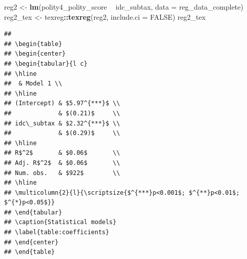 \documentclass[
]{article}
\newenvironment{Shaded}{\begin{snugshade}}{\end{snugshade}}
\newcommand{\DataTypeTok}[1]{\textcolor[rgb]{0.13,0.29,0.53}{#1}}
\newcommand{\KeywordTok}[1]{\textcolor[rgb]{0.13,0.29,0.53}{\textbf{#1}}}
\newcommand{\NormalTok}[1]{#1}
\newcommand{\OperatorTok}[1]{\textcolor[rgb]{0.81,0.36,0.00}{\textbf{#1}}}
\newcommand{\OtherTok}[1]{\textcolor[rgb]{0.56,0.35,0.01}{#1}}
\newcommand{\StringTok}[1]{\textcolor[rgb]{0.31,0.60,0.02}{#1}}
\begin{document}
\begin{Shaded}
\begin{Highlighting}[]
\NormalTok{reg2 <-}\StringTok{ }\KeywordTok{lm}\NormalTok{(polity4_polity_score }\OperatorTok{~}\StringTok{ }\NormalTok{idc_subtax, }\DataTypeTok{data =}\NormalTok{ reg_data_complete)}
\NormalTok{reg2_tex <-}\StringTok{ }\NormalTok{texreg}\OperatorTok{::}\KeywordTok{texreg}\NormalTok{(reg2, }\DataTypeTok{include.ci =} \OtherTok{FALSE}\NormalTok{)}
\NormalTok{reg2_tex}
\end{Highlighting}
\end{Shaded}

\begin{verbatim}
## 
## \begin{table}
## \begin{center}
## \begin{tabular}{l c}
## \hline
##  & Model 1 \\
## \hline
## (Intercept) & $5.97^{***}$ \\
##             & $(0.21)$     \\
## idc\_subtax & $2.32^{***}$ \\
##             & $(0.29)$     \\
## \hline
## R$^2$       & $0.06$       \\
## Adj. R$^2$  & $0.06$       \\
## Num. obs.   & $922$        \\
## \hline
## \multicolumn{2}{l}{\scriptsize{$^{***}p<0.001$; $^{**}p<0.01$; $^{*}p<0.05$}}
## \end{tabular}
## \caption{Statistical models}
## \label{table:coefficients}
## \end{center}
## \end{table}
\end{verbatim}

\begin{Shaded}
\end{Shaded}
\end{document}
